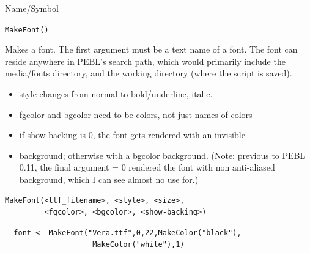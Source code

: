 \begin{desc}{Name/Symbol}
\item[Name/Symbol]	\verb+MakeFont()+

\item[Description]	Makes a font.  The first argument must be a text
  name of a font.  The font can reside anywhere in PEBL's search path,
  which would primarily include the media/fonts directory, and the
  working directory (where the script is saved).
  \begin{itemize}
  \item  style changes from normal to bold/underline, italic.
  \item    fgcolor and bgcolor need to be colors, not just names of colors
  \item  if show-backing is 0, the font gets rendered with an invisible
  \item    background; otherwise with a bgcolor background. (Note: previous to PEBL 0.11, the final argument = 0 rendered the font  with non anti-aliased background, which I can see almost no use for.)
\end{itemize}
\item[Usage]
\begin{verbatim}
MakeFont(<ttf_filename>, <style>, <size>, 
         <fgcolor>, <bgcolor>, <show-backing>)
\end{verbatim}

\item[Example]	
\begin{verbatim}
  font <- MakeFont("Vera.ttf",0,22,MakeColor("black"),
                    MakeColor("white"),1)
\end{verbatim}

\item[See Also]	
\end{desc}


